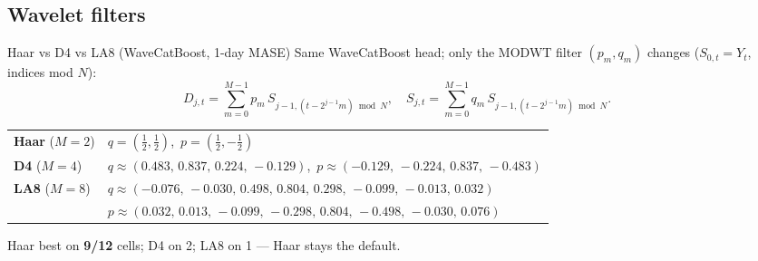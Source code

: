 \subsection{Wavelet filters}
\begin{frame}{Haar vs D4 vs LA8 (WaveCatBoost, 1-day MASE)}
  {\scriptsize
  Same WaveCatBoost head; only the MODWT filter $(p_m,q_m)$ changes
  ($S_{0,t}=Y_t$, indices mod $N$):
  \[
    D_{j,t}=\sum_{m=0}^{M-1}p_m\,S_{j-1,(t-2^{j-1}m)\bmod N},\quad
    S_{j,t}=\sum_{m=0}^{M-1}q_m\,S_{j-1,(t-2^{j-1}m)\bmod N}.
  \]
  }
  {\tiny
  \centering
  \renewcommand{\arraystretch}{1.15}
  \begin{tabular}{@{}l@{\hspace{0.6em}}l@{}}
    \textbf{Haar} ($M{=}2$) &
      $q=(\tfrac12,\tfrac12)$,\ $p=(\tfrac12,-\tfrac12)$ \\
    \textbf{D4} ($M{=}4$) &
      $q\approx(0.483,\,0.837,\,0.224,\,-0.129)$,\
      $p\approx(-0.129,\,-0.224,\,0.837,\,-0.483)$ \\
    \textbf{LA8} ($M{=}8$) &
      $q\approx(-0.076,\,-0.030,\,0.498,\,0.804,\,0.298,\,-0.099,\,-0.013,\,0.032)$ \\
      & $p\approx(0.032,\,0.013,\,-0.099,\,-0.298,\,0.804,\,-0.498,\,-0.030,\,0.076)$ \\
  \end{tabular}
  }
  \vspace{0.25em}
  {\tiny
  \centering
  }
  \vspace{0.2em}
  {\scriptsize
  Haar best on \textbf{9/12} cells; D4 on 2; LA8 on 1 --- Haar stays the default.
  }
\end{frame}

